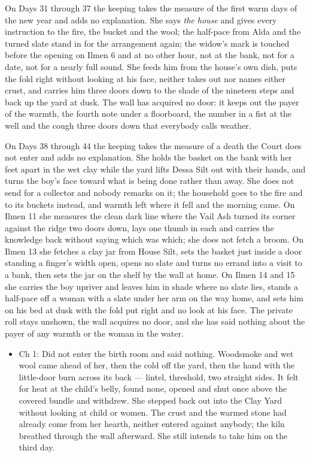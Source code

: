 \documentclass{design/chronicle}
\begin{document}
{On Days 31 through 37 the keeping takes the measure of the first warm days of the new year and adds no explanation. She says \emph{the house} and gives every instruction to the fire, the bucket and the wool; the half-pace from Alda and the turned slate stand in for the arrangement again; the widow’s mark is touched before the opening on Ilmen 6 and at no other hour, not at the bank, not for a date, not for a nearly full sound. She feeds him from the house’s own dish, puts the fold right without looking at his face, neither takes out nor names either crust, and carries him three doors down to the shade of the nineteen steps and back up the yard at dusk. The wall has acquired no door: it keeps out the payer of the warmth, the fourth note under a floorboard, the number in a fist at the well and the cough three doors down that everybody calls weather.

On Days 38 through 44 the keeping takes the measure of a death the Court does not enter and adds no explanation. She holds the basket on the bank with her feet apart in the wet clay while the yard lifts Dessa Silt out with their hands, and turns the boy’s face toward what is being done rather than away. She does not send for a collector and nobody remarks on it; the household goes to the fire and to its buckets instead, and warmth left where it fell and the morning came. On Ilmen 11 she measures the clean dark line where the Vail Ash turned its corner against the ridge two doors down, lays one thumb in each and carries the knowledge back without saying which was which; she does not fetch a broom. On Ilmen 13 she fetches a clay jar from House Silt, sets the basket just inside a door standing a finger’s width open, opens no slate and turns no errand into a visit to a bank, then sets the jar on the shelf by the wall at home. On Ilmen 14 and 15 she carries the boy upriver and leaves him in shade where no slate lies, stands a half-pace off a woman with a slate under her arm on the way home, and sets him on his bed at dusk with the fold put right and no look at his face. The private roll stays unshown, the wall acquires no door, and she has said nothing about the payer of any warmth or the woman in the water.

\begin{itemize}[leftmargin=1.4em,itemsep=1pt,topsep=3pt,parsep=0pt]

\item Ch 1: Did not enter the birth room and said nothing. Woodsmoke and wet wool came ahead of her, then the cold off the yard, then the hand with the little-door burn across its back --- lintel, threshold, two straight sides. It felt for heat at the child’s belly, found none, opened and shut once above the covered bundle and withdrew. She stepped back out into the Clay Yard without looking at child or women. The crust and the warmed stone had already come from her hearth, neither entered against anybody; the kiln breathed through the wall afterward. She still intends to take him on the third day.


\end{itemize}}
\end{document}
